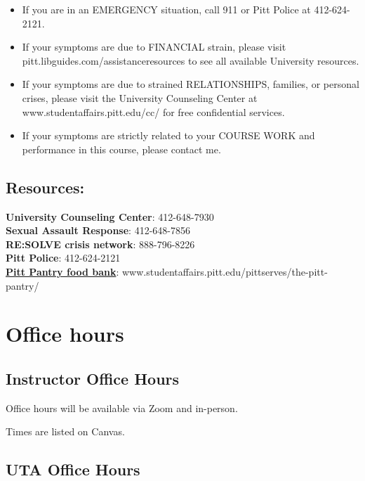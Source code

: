 \documentclass[
]{book}
\providecommand{\tightlist}{%
  \setlength{\itemsep}{0pt}\setlength{\parskip}{0pt}}
\begin{document}
\begin{itemize}
\tightlist
\item
  If you are in an EMERGENCY situation, call 911 or Pitt Police at 412-624-2121.
\item
  If your symptoms are due to FINANCIAL strain, please visit pitt.libguides.com/assistanceresources to see all available University resources.
\item
  If your symptoms are due to strained RELATIONSHIPS, families, or personal crises, please visit the University Counseling Center at www.studentaffairs.pitt.edu/cc/ for free confidential services.
\item
  If your symptoms are strictly related to your COURSE WORK and performance in this course, please contact me.
\end{itemize}

\hypertarget{resources}{%
\section{Resources:}\label{resources}}

\textbf{University Counseling Center}: 412-648-7930\\
\textbf{Sexual Assault Response}: 412-648-7856\\
\textbf{RE:SOLVE crisis network}: 888-796-8226\\
\textbf{Pitt Police}: 412-624-2121\\
\href{https://www.studentaffairs.pitt.edu/pittserves/the-pitt-pantry/}{\textbf{Pitt Pantry food bank}}:
www.studentaffairs.pitt.edu/pittserves/the-pitt-pantry/

\hypertarget{office-hours}{%
\chapter{Office hours}\label{office-hours}}

\hypertarget{instructor-office-hours}{%
\section{Instructor Office Hours}\label{instructor-office-hours}}

Office hours will be available via Zoom and in-person.

Times are listed on Canvas.

\hypertarget{uta-office-hours}{%
\section{UTA Office Hours}\label{uta-office-hours}}
\end{document}
